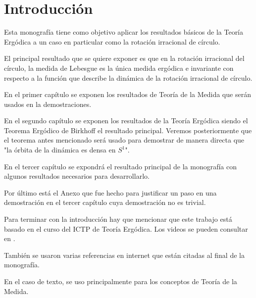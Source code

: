 \chapter{Introducción}

Esta monografía tiene como objetivo aplicar los resultados básicos de la Teoría Ergódica a un caso en particular como la rotación irracional de círculo.

El principal resultado que se quiere exponer es que en la rotación irracional del círculo, la medida de Lebesgue es la única medida ergódica e invariante con respecto a la función que describe la dinámica de la rotación irracional de círculo.

En el primer capítulo se exponen los resultados de Teoría de la Medida que serán usados en la demostraciones.

En el segundo capítulo se exponen los resultados de la Teoría Ergódica siendo el Teorema Ergódico de Birkhoff el resultado principal. Veremos posteriormente que el teorema antes mencionado será usado para demostrar de manera directa que "la órbita de la dinámica es densa en $S^1$".

En el tercer capítulo se expondrá el resultado principal de la monografía con algunos resultados necesarios para desarrollarlo.

Por último está el Anexo que fue hecho para justificar un paso en una demostración en el tercer capítulo cuya demostración no es trivial.

Para terminar con la introducción hay que mencionar que este trabajo está basado en el curso del ICTP de Teoría Ergódica. Los videos se pueden consultar en \cite{youtube}.

También se usaron varias referencias en internet que están citadas al final de la monografía.

En el caso de texto, se uso principalmente \cite{bartle} para los conceptos de Teoría de la Medida.